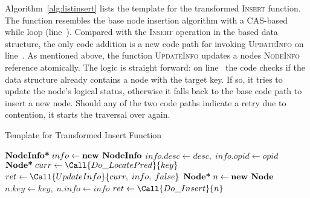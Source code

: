 Algorithm~\ref{alg:listinsert} lists the template for the transformed \textsc{Insert} function.
The function resembles the base node insertion algorithm with a CAS-based while loop (line~).
Compared with the \textsc{Insert} operation in the based data structure, the only code addition is a new code path for invoking \textsc{UpdateInfo} on line~.
As mentioned above, the function \textsc{UpdateInfo} updates a nodes \textsc{NodeInfo} reference atomically.
The logic is straight forward: on line~ the code checks if the data structure already contains a node with the target key.
If so, it tries to update the node's logical status, otherwise it falls back to the base code path to insert a new node. 
Should any of the two code paths indicate a retry due to contention, it starts the traversal over again.

\begin{algorithm}[t]
    \caption{Template for Transformed Insert Function}
    \label{alg:listinsert}
    \begin{algorithmic}[1]
        \State $\textbf{NodeInfo*}\; info \gets \text{\textbf{new NodeInfo}}$
        \State $info.desc \gets desc,\;info.opid \gets opid$
        \While{\TRUE} \label{l:listinsertwhile}
        \State $\textbf{Node*}\;curr \gets \Call{Do\_LocatePred}{key}$
         \label{l:listinsertcontain}
        \State $ret \gets \Call{UpdateInfo}{curr,\;info,\;false}$ \label{l:insupdateinfo}
        \Else
        \State $\textbf{Node*}\; n \gets \text{\textbf{new Node}}$
        \State $n.key \gets key,\;n.info \gets info$
        \State $ret \gets \Call{Do\_Insert}{n}$ \label{l:linknode}
        \EndIf
        \State \Return \TRUE
        \State \Return \FALSE
        \EndIf
        \EndWhile
        \EndFunction
    \end{algorithmic}
\end{algorithm}

